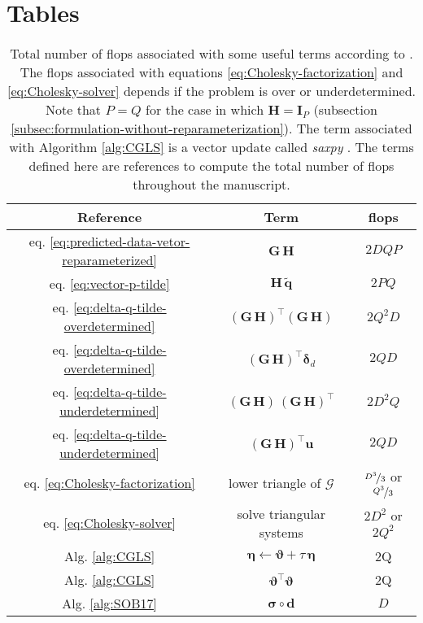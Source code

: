 \section{Tables}

\begin{table}[h!]
	\centering
	\begin{tabular}{c c c}
		Reference & Term & flops \\
		\hline
		eq. \ref{eq:predicted-data-vetor-reparameterized} & $\mathbf{G \, H}$ & $2DQP$ \\
		eq. \ref{eq:vector-p-tilde} & $\mathbf{H} \, \tilde{\mathbf{q}}$ & $2PQ$ \\
		eq. \ref{eq:delta-q-tilde-overdetermined} & $\left(\mathbf{G \, H}\right)^{\top}\left(\mathbf{G \, H}\right)$ & $2Q^{2}D$ \\
		eq. \ref{eq:delta-q-tilde-overdetermined} & $\left(\mathbf{G \, H}\right)^{\top}\boldsymbol{\delta}_{d} $ & $2QD$ \\
		eq. \ref{eq:delta-q-tilde-underdetermined} & $\left(\mathbf{G \, H}\right) \, \left(\mathbf{G \, H}\right)^{\top}$ & $2D^{2}Q$ \\
		eq. \ref{eq:delta-q-tilde-underdetermined} & $\left(\mathbf{G \, H}\right)^{\top}\mathbf{u}$ & $2QD$ \\
		eq. \ref{eq:Cholesky-factorization} & lower triangle of $\boldsymbol{\mathcal{G}}$ & $\nicefrac{D^{3}}{3}$ or $\nicefrac{Q^{3}}{3}$ \\
		eq. \ref{eq:Cholesky-solver} & solve triangular systems & $2D^{2}$ or $2Q^{2}$ \\
		Alg. \ref{alg:CGLS} & $\boldsymbol{\eta} \gets \boldsymbol{\vartheta} + \tau \, \boldsymbol{\eta}$ & 2Q \\
		Alg. \ref{alg:CGLS} & $\boldsymbol{\vartheta}^{\top} \boldsymbol{\vartheta}$ & 2Q \\
		Alg. \ref{alg:SOB17} & $\boldsymbol{\sigma} \circ \mathbf{d}$ & $D$ \\
	\end{tabular}
	\caption{
		Total number of flops associated with some useful terms according to \citet[][p. 12]{golub-vanloan2013}.
		The flops associated with equations \ref{eq:Cholesky-factorization} and \ref{eq:Cholesky-solver} depends if the
		problem is over or underdetermined.
		Note that $P = Q$ for the case in which $\mathbf{H} = \mathbf{I}_{P}$ (subsection \ref{subsec:formulation-without-reparameterization}).
		The term associated with Algorithm \ref{alg:CGLS} is a vector update called \textit{saxpy} \citep[][p. 4]{golub-vanloan2013}.
		The terms defined here are references to compute the total number of flops throughout the manuscript.
	}
	\label{tab:standard-flops}
\end{table}